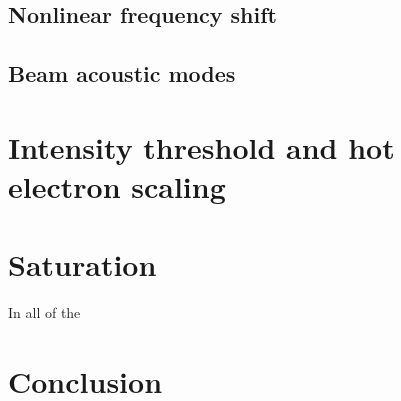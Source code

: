 \subsection{Nonlinear frequency shift}
\subsection{Beam acoustic modes}

\section{Intensity threshold and hot electron scaling}\label{sec:paramScan}

\section{Saturation}
In all of the 

\section{Conclusion}\label{sec:conclusion}


